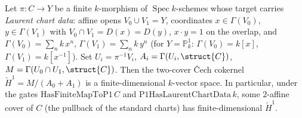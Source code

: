\begin{theorem}
  \label{thm:adelic_finiteDimensional_cokernel_zero}
  \leanok
  Let \(\pi \colon C \to Y\) be a finite \(k\)-morphism of
  \(\operatorname{Spec} k\)-schemes whose target carries \emph{Laurent
  chart data}: affine opens \(V_0 \cup V_1 = Y\), coordinates
  \(x \in \Gamma(V_0)\), \(y \in \Gamma(V_1)\) with
  \(V_0 \cap V_1 = D(x) = D(y)\), \(x \cdot y = 1\) on the overlap, and
  \(\Gamma(V_0) = \sum_n k\, x^n\), \(\Gamma(V_1) = \sum_n k\, y^n\) (for
  \(Y = \mathbb{P}^1_k\): \(\Gamma(V_0) = k[x]\),
  \(\Gamma(V_1) = k[x^{-1}]\)). Set \(U_i = \pi^{-1} V_i\),
  \(A_i = \Gamma(U_i, \struct{C})\),
  \(M = \Gamma(U_0 \cap U_1, \struct{C})\). Then the two-cover Čech
  cokernel \(\check{H}^1 = M/(A_0 + A_1)\) is a finite-dimensional
  \(k\)-vector space. In particular, under the gates
  \(\mathrm{HasFiniteMapToP1}\, C\) and \(\mathrm{P1HasLaurentChartData}\,
  k\), some \(2\)-affine cover of \(C\) (the pullback of the standard
  charts) has finite-dimensional \(\check{H}^1\).
\end{theorem}
